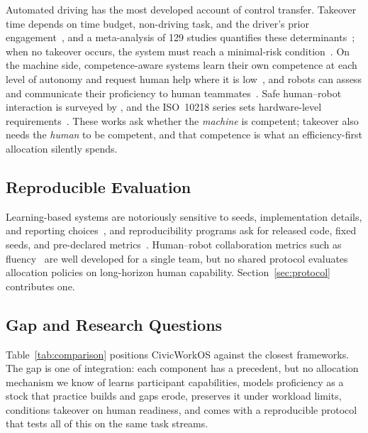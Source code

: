 \documentclass[utf8]{FrontiersinHarvard}
\begin{document}
	Automated driving has the most developed account of control transfer. Takeover time depends on time budget, non-driving task, and the driver's prior engagement~\citep{Gold2013}, and a meta-analysis of 129 studies quantifies these determinants~\citep{Zhang2019}; when no takeover occurs, the system must reach a minimal-risk condition~\citep{SAEJ3016}. On the machine side, competence-aware systems learn their own competence at each level of autonomy and request human help where it is low~\citep{Basich2020}, and robots can assess and communicate their proficiency to human teammates~\citep{Norton2022}. Safe human--robot interaction is surveyed by \citet{Lasota2017}, and the ISO~10218 series sets hardware-level requirements~\citep{ISO2025,ISO2025b}. These works ask whether the \textit{machine} is competent; takeover also needs the \textit{human} to be competent, and that competence is what an efficiency-first allocation silently spends.

	\subsection{Reproducible Evaluation}
	\label{sec:rw-repro}

	Learning-based systems are notoriously sensitive to seeds, implementation details, and reporting choices~\citep{Henderson2018}, and reproducibility programs ask for released code, fixed seeds, and pre-declared metrics~\citep{Pineau2021}. Human--robot collaboration metrics such as fluency~\citep{Hoffman2019} are well developed for a single team, but no shared protocol evaluates allocation policies on long-horizon human capability. Section~\ref{sec:protocol} contributes one.

	\subsection{Gap and Research Questions}
	\label{sec:gap}

	Table~\ref{tab:comparison} positions CivicWorkOS against the closest frameworks. The gap is one of integration: each component has a precedent, but no allocation mechanism we know of learns participant capabilities, models proficiency as a stock that practice builds and gaps erode, preserves it under workload limits, conditions takeover on human readiness, and comes with a reproducible protocol that tests all of this on the same task streams.
\end{document}
